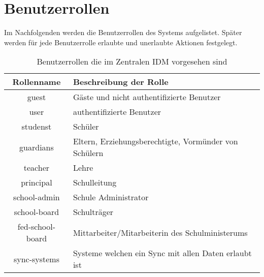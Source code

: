 \section{Benutzerrollen}
Im Nachfolgenden werden die Benutzerrollen des Systems aufgelistet. 
Später werden für jede Benutzerrolle erlaubte und unerlaubte Aktionen festgelegt.


\begin{table}[htb]
	\begin{tabularx}{\textwidth}{|c|X|}
		\hline
\textbf{Rollenname} & \textbf{Beschreibung der Rolle} \\ \hline
guest & Gäste und nicht authentifizierte Benutzer \\ \hline
user & authentifizierte Benutzer \\ \hline
studenst & Schüler \\ \hline
guardians & Eltern, Erziehungsberechtigte, Vormünder von Schülern \\ \hline
teacher & Lehre \\ \hline
principal & Schulleitung \\ \hline
school-admin & Schule Administrator \\ \hline
school-board & Schulträger \\ \hline
fed-school-board & Mittarbeiter/Mitarbeiterin des Schulministerums \\ \hline
sync-systems & Systeme welchen ein Sync mit allen Daten erlaubt ist \\ \hline

	\end{tabularx}

		\caption{Benutzerrollen die im Zentralen IDM vorgesehen sind}
		\label{tab:intro:roles}
\end{table}